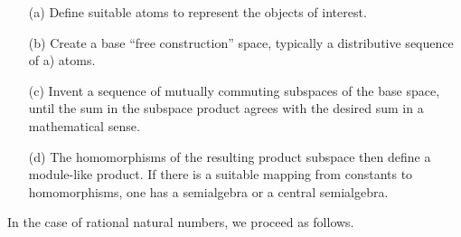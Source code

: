 \documentclass[11pt]{article}
\begin{document}
 \begin{itemize}
 \item[(a)]{Define suitable atoms to represent the objects of interest.}
 \item[(b)]{Create a base ``free construction'' space, typically a distributive sequence of a) atoms.} 
 \item[(c)]{Invent a sequence of mutually commuting subspaces of the base space, until the sum in the subspace product agrees with the desired sum in 
 a mathematical sense.}
 \item[(d)]{The homomorphisms of the resulting product subspace then define a module-like product.  If there is a suitable mapping 
 from constants to homomorphisms, one has a semialgebra or a central semialgebra.}
 \end{itemize}
 In the case of rational natural numbers, we proceed as follows.
\end{document}
